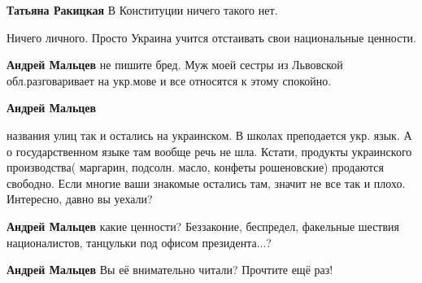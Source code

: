 \begin{itemize}
\begin{itemize}
\textbf{Татьяна Ракицкая} В Конституции ничего такого нет.

 
Ничего личного. Просто Украина учится отстаивать свои национальные ценности.

 
\textbf{Андрей Мальцев} не пишите бред. Муж моей сестры из Львовской обл.разговаривает на укр.мове и все относятся к этому спокойно.

 
\textbf{Андрей Мальцев} 

названия улиц так и остались на украинском. В школах
преподается укр. язык. А о государственном языке там вообще речь не шла.
Кстати, продукты украинского производства( маргарин, подсолн. масло, конфеты
рошеновские) продаются свободно. Если многие ваши знакомые остались там, значит
не все так и плохо. Интересно, давно вы уехали?


 
\textbf{Андрей Мальцев} какие ценности? Беззаконие, беспредел, факельные шествия националистов, танцульки под офисом президента...?

 
\textbf{Андрей Мальцев} Вы её внимательно читали? Прочтите ещё раз!


\end{itemize}
\end{itemize}
